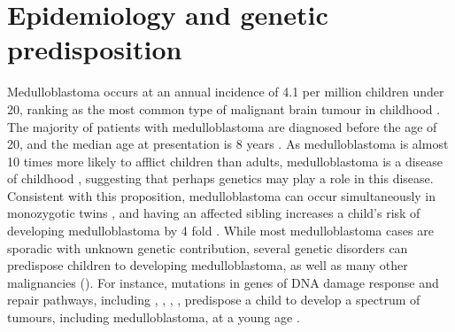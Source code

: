 \section{Epidemiology and genetic predisposition}

Medulloblastoma occurs at an annual incidence of 4.1 per million children under 20, ranking as the most common type of malignant brain tumour in childhood . The majority of patients with medulloblastoma are diagnosed before the age of 20, and the median age at presentation is 8 years . As medulloblastoma is almost 10 times more likely to afflict children than adults, medulloblastoma is a disease of childhood , suggesting that perhaps genetics may play a role in this disease. Consistent with this proposition, medulloblastoma can occur simultaneously in monozygotic twins , and having an affected sibling increases a child's risk of developing medulloblastoma by 4 fold . While most medulloblastoma cases are sporadic with unknown genetic contribution, several genetic disorders can predispose children to developing medulloblastoma, as well as many other malignancies (). For instance, mutations in genes of DNA damage response and repair pathways, including , , , , predispose a child to develop a spectrum of tumours, including medulloblastoma, at a young age .


